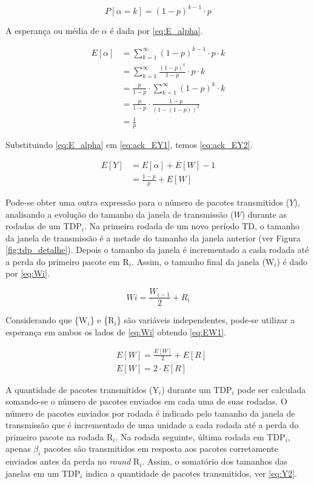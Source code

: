 \begin{equation} \label{eq:P_alpha}
P[\alpha=k]=(1 - p)^{k - 1} \cdot p
\end{equation}

A esperança ou média de $\alpha$ é dada por \eqref{eq:E_alpha}.

\begin{align} \label{eq:E_alpha}
\nonumber E[\alpha] &= \sum_{k=1}^\infty (1 - p)^{k - 1} \cdot  p \cdot  k \\
\nonumber &= \sum_{k=1}^\infty \frac{(1 - p)^{k}}{1 - p} \cdot  p \cdot  k\\ 
\nonumber &= \frac{p}{1 - p} \cdot  \sum_{k=1}^\infty (1 - p)^k \cdot  k \\ 
\nonumber &= \frac{p}{1 - p} \cdot  \frac{1 - p}{(1 - (1 - p))^2} \\
&= \frac{1}{p}
\end{align}

Substituindo \eqref{eq:E_alpha} em \eqref{eq:ack_EY1}, temos \eqref{eq:ack_EY2}. 

\begin{align} \label{eq:ack_EY2}
\nonumber E[Y] &= E[\alpha] + E[W] - 1 \\
&= \frac{1 - p}{p} + E[W]
\end{align}

Pode-se obter uma outra expressão para o número de pacotes transmitidos ($Y$), analisando
a evolução do tamanho da janela de transmissão ($W$) durante as rodadas de um TDP$_i$.
Na primeira rodada de um novo período TD, o tamanho da janela de transmissão é a metade
do tamanho da janela anterior (ver Figura \ref{fig:tdp_detalhe}). Depois o tamanho da janela
é incrementado a cada rodada até a perda do primeiro pacote em R{$_i$}. Assim, o tamanho 
final da janela (W$_i$) é dado por \eqref{eq:Wi}.

\begin{equation} \label{eq:Wi}
Wi=\frac{W_{i-1}}{2} + R_i
\end{equation}

Considerando que \{W$_i$\} e \{R$_i$\} são variáveis independentes, pode-se utilizar a 
esperança em ambos os lados de \eqref{eq:Wi} obtendo \eqref{eq:EW1}.

\begin{align} \label{eq:EW1}
\nonumber & E[W]=\frac{E[W]}{2} + E[R] \\
& E[W]= 2 \cdot  E[R]
\end{align}

A quantidade de pacotes transmitidos (Y$_i$) durante um TDP$_i$ pode ser calculada somando-se 
o número de pacotes enviados em cada uma de suas rodadas. O número de pacotes enviados por 
rodada é indicado pelo tamanho da janela de transmissão que é incrementado de uma unidade a 
cada rodada até a perda do primeiro pacote na rodada R$_i$. Na rodada seguinte, última rodada 
em TDP$_i$, apenas $\beta_i$ pacotes são transmitidos em resposta aos pacotes corretamente 
enviados antes da perda no \textit{round} R$_i$. Assim, o somatório dos tamanhos das janelas em um 
TDP$_i$ indica a quantidade de pacotes transmitidos, ver \eqref{eq:Y2}.

